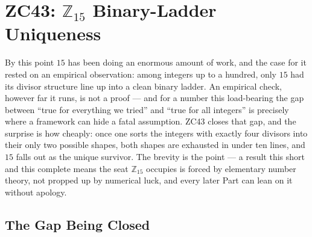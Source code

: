 \documentclass[12pt, a4paper]{article}
\begin{document}




\newpage

\section{ZC43: $\mathbb{Z}_{15}$ Binary-Ladder Uniqueness}
\label{sec:zc43}

By this point $15$ has been doing an enormous amount of work, and the case for
it rested on an empirical observation: among integers up to a hundred, only $15$
had its divisor structure line up into a clean binary ladder. An empirical
check, however far it runs, is not a proof --- and for a number this load-bearing
the gap between ``true for everything we tried'' and ``true for all integers'' is
precisely where a framework can hide a fatal assumption. ZC43 closes that gap,
and the surprise is how cheaply: once one sorts the integers with exactly four
divisors into their only two possible shapes, both shapes are exhausted in under
ten lines, and $15$ falls out as the unique survivor. The brevity is the point
--- a result this short and this complete means the seat $\mathbb{Z}_{15}$
occupies is forced by elementary number theory, not propped up by numerical luck,
and every later Part can lean on it without apology.

\begin{abstract}
ZC35 established that $n = 15$ is the unique integer with
$\tau(n) = 4$ divisors whose Euler totient values form a
strict binary ladder $\{1, 2, 4, 8\}$, verified empirically
for $n \leq 100$ (OBS-ZC35-01), and registered GAP-ZC35-01
as an open gap requiring a proof valid for all $n$.

This paper closes GAP-ZC35-01. The proof is purely algebraic:
integers with $\tau(n) = 4$ fall into exactly two classes
($n = p^3$ and $n = pq$), and both classes are exhausted in
under ten lines. The uniqueness of $(p, q) = (3, 5)$ forces
$n = 15$ as the sole solution.
\end{abstract}

\tableofcontents
\newpage

\subsection{The Gap Being Closed}
\end{document}
